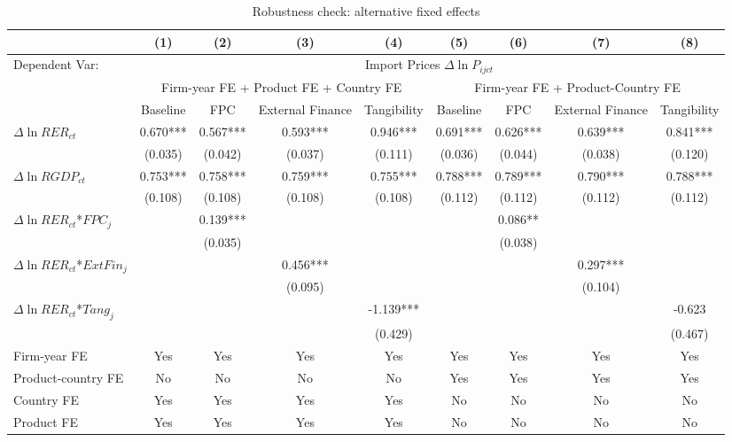 \begin{table}
	\centering
	\caption{Robustness check: alternative fixed effects}
	\begin{threeparttable}
		\begin{tabular}{lcccccccc}
			\toprule
			& (1)   & (2)   & (3)   & (4) &  (5)  &  (6)  & (7)  & (8)\\
			\midrule
                Dependent Var: & \multicolumn{8}{c}{ Import Prices $\Delta \ln P_{ijct}$} \\
			& \multicolumn{4}{c}{Firm-year FE + Product FE + Country FE} & \multicolumn{4}{c}{Firm-year FE + Product-Country FE}\\
			& Baseline & FPC   & External Finance & Tangibility & Baseline & FPC & External Finance & Tangibility\\
			\midrule
			$\Delta \ln RER_{ct}$ & 0.670*** & 0.567*** & 0.593*** & 0.946*** & 0.691*** & 0.626*** & 0.639*** & 0.841*** \\
                & (0.035) & (0.042) & (0.037) & (0.111) & (0.036) & (0.044) & (0.038) & (0.120) \\
			$\Delta \ln RGDP_{ct}$ & 0.753*** & 0.758*** & 0.759*** & 0.755*** & 0.788*** & 0.789*** & 0.790*** & 0.788*** \\
			& (0.108) & (0.108) & (0.108) & (0.108) & (0.112) & (0.112) & (0.112) & (0.112) \\
			$\Delta \ln RER_{ct}$*$FPC_{j}$ &  & 0.139*** &       &       &       & 0.086** &       &  \\
			&  & (0.035) &       &       &       & (0.038) &       &  \\
			$\Delta \ln RER_{ct}$*$ExtFin_{j}$ &   &       & 0.456*** &       &       &       & 0.297*** &  \\
			&  &       & (0.095) &       &       &       & (0.104) &  \\
			$\Delta \ln RER_{ct}$*$Tang_{j}$ &   &       &       & -1.139*** &       &       &       & -0.623 \\
			&   &       &       & (0.429) &       &       &       & (0.467) \\
                \midrule
			Firm-year FE  &  Yes   & Yes   & Yes & Yes & Yes & Yes & Yes & Yes\\
			Product-country FE & No & No & No & No & Yes & Yes & Yes & Yes\\
			Country FE &  Yes   & Yes   & Yes   & Yes & No & No & No & No\\
			Product FE &  Yes   & Yes   & Yes   & Yes & No & No & No & No\\

\end{tabular}
\end{threeparttable}
\end{table}
